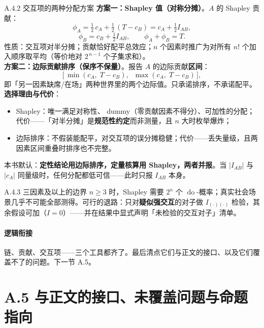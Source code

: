 \documentclass[../../main2.tex]{subfiles}
\begin{document}
	\begin{mathbox}{A.4.2 交互项的两种分配方案}
		\textbf{方案一：Shapley 值（对称分摊）}。$A$ 的 Shapley 贡献：
		\[ \phi_A = \tfrac{1}{2}\, c_A + \tfrac{1}{2}\, (T - c_B) = c_A + \tfrac{1}{2} I_{AB}, \]
		\[ \phi_B = c_B + \tfrac{1}{2} I_{AB}, \qquad \phi_A + \phi_B = T. \]
		性质：交互项对半分摊；贡献恰好配平总效应；$n$ 个因素时推广为对所有 $n!$ 个加入顺序取平均（等价地对 $2^{\,n-1}$ 个子集求和）。\\[0.5em]
		\textbf{方案二：边际贡献排序（保序不保量）}。报告 $A$ 的边际贡献\textbf{区间}：
		\[ \big[\, \min(c_A,\; T - c_B),\;\; \max(c_A,\; T - c_B) \,\big], \]
		即「另一因素缺席/在场」两种世界里的两个边际值。只承诺排序，不承诺配平。\\[0.5em]
		\textbf{选择理由与代价}：
		\begin{itemize}
			\item Shapley：唯一满足对称性、 dummy（零贡献因素不得分）、可加性的分配；代价——「对半分摊」是\textbf{规范性约定}而非测量，且 $n$ 大时枚举爆炸；
			\item 边际排序：不假装能配平，对交互项的误分摊稳健；代价——丢失量级，且两因素区间重叠时排序也不完整。
		\end{itemize}
		本书默认：\textbf{定性结论用边际排序，定量核算用 Shapley，两者并报}。当 $|I_{AB}|$ 与 $|c_A|$ 同量级时，任何分配都低可信——此时只报 $I_{AB}$ 本身。
	\end{mathbox}

	\begin{mathbox}{A.4.3 三因素及以上的边界}
		$n \ge 3$ 时，Shapley 需要 $2^n$ 个 $\operatorname{do}$-概率；真实社会场景几乎不可能全部测得。可行的退路：只对\textbf{疑似强交互}的对子做 $I_{(\cdot)(\cdot)}$ 检验，其余假设可加（$I = 0$）——并在结果中显式声明「未检验的交互对子」清单。
	\end{mathbox}

	\paragraph*{逻辑衔接}
	链、贡献、交互项——三个工具都齐了。最后清点它们与正文的接口、以及它们覆盖不了的问题。下一节 A.5。

	\section{A.5 与正文的接口、未覆盖问题与命题指向}
	\label{app:interface}
\end{document}
